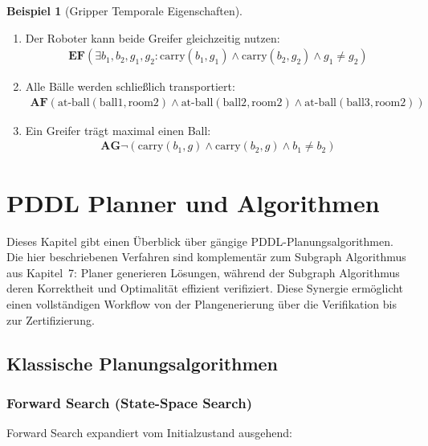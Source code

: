 ﻿\documentclass[a4paper,12pt]{article}
\theoremstyle{definition}
\newtheorem{beispiel}{Beispiel}[section]
\begin{document}
\begin{beispiel}[Gripper Temporale Eigenschaften]
	\begin{enumerate}
		\item Der Roboter kann beide Greifer gleichzeitig nutzen:
		\begin{align}
		\mathbf{EF}(\exists b_1, b_2, g_1, g_2: \text{carry}(b_1, g_1) \land \text{carry}(b_2, g_2) \land g_1 \neq g_2)
		\end{align}
		
		\item Alle Bälle werden schließlich transportiert:
		\begin{align}
		\mathbf{AF}(\text{at-ball}(\text{ball1}, \text{room2}) \land \text{at-ball}(\text{ball2}, \text{room2}) \land \text{at-ball}(\text{ball3}, \text{room2}))
		\end{align}
		
		\item Ein Greifer trägt maximal einen Ball:
		\begin{align}
		\mathbf{AG}\neg(\text{carry}(b_1, g) \land \text{carry}(b_2, g) \land b_1 \neq b_2)
		\end{align}
	\end{enumerate}
\end{beispiel}

\section{PDDL Planner und Algorithmen}

Dieses Kapitel gibt einen Überblick über gängige PDDL-Planungsalgorithmen. Die hier beschriebenen Verfahren sind komplementär zum Subgraph Algorithmus aus Kapitel~7: Planer generieren Lösungen, während der Subgraph Algorithmus deren Korrektheit und Optimalität effizient verifiziert. Diese Synergie ermöglicht einen vollständigen Workflow von der Plangenerierung über die Verifikation bis zur Zertifizierung.

\subsection{Klassische Planungsalgorithmen}

\subsubsection{Forward Search (State-Space Search)}

Forward Search expandiert vom Initialzustand ausgehend:
\end{document}
